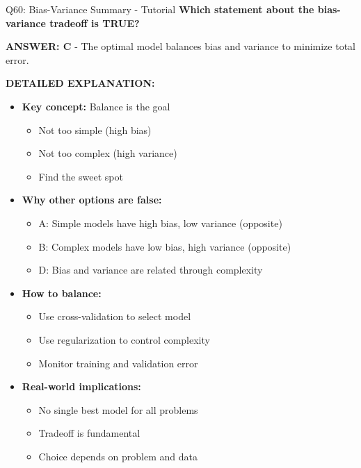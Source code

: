 \documentclass[8pt]{beamer}
\begin{document}
	\begin{frame}{Q60: Bias-Variance Summary - Tutorial}
		\fontsize{6.5}{7.5}\selectfont
		\textbf{Which statement about the bias-variance tradeoff is TRUE?}
		
		\vspace{0.05cm}
		\textcolor{myblue}{\textbf{ANSWER: C}} - The optimal model balances bias and variance to minimize total error.
		
		\vspace{0.05cm}
		\textbf{DETAILED EXPLANATION:}
		\begin{itemize}
			\item \textbf{Key concept:} Balance is the goal
			\begin{itemize}
				\item Not too simple (high bias)
				\item Not too complex (high variance)
				\item Find the sweet spot
			\end{itemize}
			\item \textbf{Why other options are false:}
			\begin{itemize}
				\item \textcolor{myred}{A:} Simple models have high bias, low variance (opposite)
				\item \textcolor{myred}{B:} Complex models have low bias, high variance (opposite)
				\item \textcolor{myred}{D:} Bias and variance are related through complexity
			\end{itemize}
			\item \textbf{How to balance:}
			\begin{itemize}
				\item Use cross-validation to select model
				\item Use regularization to control complexity
				\item Monitor training and validation error
			\end{itemize}
			\item \textbf{Real-world implications:}
			\begin{itemize}
				\item No single best model for all problems
				\item Tradeoff is fundamental
				\item Choice depends on problem and data
			\end{itemize}
		\end{itemize}
		

\end{frame}
\end{document}
